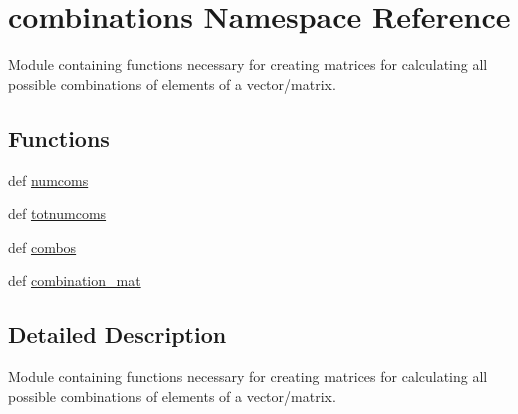 \hypertarget{namespacecombinations}{
\section{combinations Namespace Reference}
\label{d7/d2b/namespacecombinations}
}


Module containing functions necessary for creating matrices for calculating all possible combinations of elements of a vector/matrix.  


\subsection*{Functions}
\begin{DoxyCompactItemize}
\item 
def \hyperlink{namespacecombinations_a291e325d47c2536bd076643ed9e43a18}{numcoms}
\item 
def \hyperlink{namespacecombinations_abefb44c848756b98f722e3fa81efda7d}{totnumcoms}
\item 
def \hyperlink{namespacecombinations_ad6b224efacd64f54ea9aed50553a90e7}{combos}
\item 
def \hyperlink{namespacecombinations_a588fb56fb35f2df61790cf15ef69375c}{combination\_\-mat}
\end{DoxyCompactItemize}


\subsection{Detailed Description}
Module containing functions necessary for creating matrices for calculating all possible combinations of elements of a vector/matrix. 

